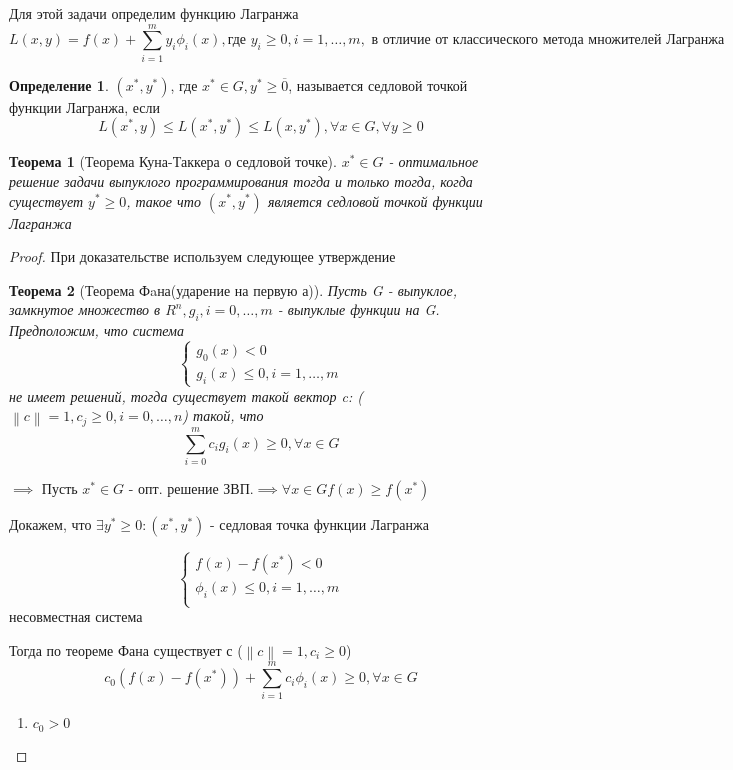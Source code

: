 \documentclass[a4paper]{article}
\newtheorem{theorem}{Теорема}[section]
\theoremstyle{definition}
\newtheorem*{definition}{Определение}
\theoremstyle{remark}
\begin{document}
Для этой задачи определим функцию Лагранжа
\[L(x, y) = f(x) +\sum_{i = 1}^m y_i \phi_i(x), \text{где } y_i\ge 0, i = 1, \dots, m, \text{ в отличие от классического метода множителей Лагранжа}\]
\begin{definition}
    $(x^*, y^*)$, где $x^*\in G, y^*\ge \overline{0}$, называется седловой точкой функции Лагранжа, если 
    \[L(x^*, y)\le L(x^*, y^*)\le L(x, y^*), \forall x\in G, \forall y\ge 0 \]
\end{definition}
\begin{theorem}[Теорема Куна-Таккера о седловой точке]
    $x^*\in G$ - оптимальное решение задачи выпуклого программирования тогда и только тогда, когда существует $y^* \ge 0$, такое что $(x^*, y^*)$ является седловой точкой функции Лагранжа    
\end{theorem}
\begin{proof}
    При доказательстве используем следующее утверждение
    \begin{theorem}[Теорема Фaна(ударение на первую а)]
        Пусть G -  выпуклое, замкнутое множество в $R^n, g_i, i = 0, \dots, m$ - выпуклые функции на G. 
        Предположим, что система 
        \[\begin{cases}
            g_0(x)< 0\\
            g_i(x) \le 0, i = 1, \dots, m
        \end{cases}\]
        не имеет решений, тогда существует такой вектор c:  ($\left\lVert c\right\rVert  = 1, c_j \ge 0, i = 0, \dots, n$) такой, что 
        \[\sum_{i = 0}^m c_i g_i(x)\ge 0, \forall x\in G\]
    \end{theorem}
    $\implies$ Пусть $x^* \in G$ - опт. решение ЗВП.$\implies \forall x\in G f(x) \ge f(x^*)$

    Докажем, что $\exists y^* \ge 0 : (x^*, y^*)$ - седловая точка функции Лагранжа

    \[\begin{cases}
        f(x)- f(x^*)< 0 \\ 
        \phi_i(x) \le 0, i = 1, \dots, m \\
    \end{cases}\]
    несовместная система

    Тогда по теореме Фана существует с ($\left\lVert c\right\rVert  = 1, c_i \ge 0$)
    \[c_0(f(x) - f(x^*)) + \sum_{i = 1}^m c_i \phi_i(x)\ge 0, \forall x\in G\]
    
    \begin{enumerate}
        \item $c_0> 0$


\end{enumerate}
\end{proof}
\end{document}
